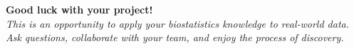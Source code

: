 \documentclass[11pt]{article}
\begin{document}
\vspace{12pt}

\begin{center}
\textbf{\Large Good luck with your project!}\\
\vspace{6pt}
\textit{This is an opportunity to apply your biostatistics knowledge to real-world data.}\\
\textit{Ask questions, collaborate with your team, and enjoy the process of discovery.}
\end{center}
\end{document}
